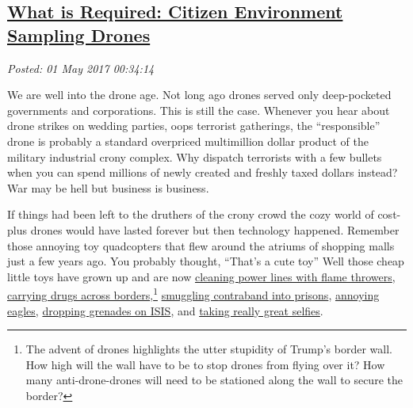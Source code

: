 %

\subsection*{\href{https://analyzethedatanotthedrivel.org/2017/04/30/what-is-required-citizen-environment-sampling-drones/}{What is Required: Citizen Environment Sampling Drones}}


\noindent\emph{Posted: 01 May 2017 00:34:14}
\vspace{6pt}

We are well into the drone age. Not long ago drones served only
deep-pocketed governments and corporations. This is still the case.
Whenever you hear about drone strikes on wedding parties, oops terrorist
gatherings, the ``responsible'' drone is probably a standard overpriced
multimillion dollar product of the military industrial crony complex.
Why dispatch terrorists with a few bullets when you can spend millions
of newly created and freshly taxed dollars instead? War may be hell but
business is business.

If things had been left to the druthers of the crony crowd the cozy
world of cost-plus drones would have lasted forever but then technology
happened. Remember those annoying toy quadcopters that flew around the
atriums of shopping malls just a few years ago. You probably thought,
``That's a cute toy'' Well those cheap little toys have grown up and are
now
\href{http://www.popularmechanics.com/flight/drones/a25282/flame-throwing-drones/}{cleaning
power lines with flame throwers},
\href{http://dailycaller.com/2016/03/30/narco-drones-the-cartels-newest-tech-savvy-smuggling-sop-spooks-security-experts/}{carrying
drugs across borders},\footnote{The advent of drones highlights the utter stupidity of Trump's border
wall. How high will the wall have to be to stop drones from flying
over it? How many anti-drone-drones will need to be stationed along
the wall to secure the border?} %
\href{https://www.washingtonpost.com/local/prisons-try-to-stop-drones-from-delivering-drugs-porn-and-cellphones-to-inmates/2016/10/12/645fb102-800c-11e6-8d0c-fb6c00c90481_story.html}{smuggling
contraband into prisons},
\href{https://www.youtube.com/watch?v=vdgvlHH3JSA}{annoying eagles},
\href{http://nypost.com/2017/03/16/war-against-isis-now-involves-shuttlecock-grenades-dropped-by-drones/}{dropping
grenades on ISIS}, and
\href{https://www.youtube.com/watch?v=FZOgy5V9imI}{taking really great
selfies}.


